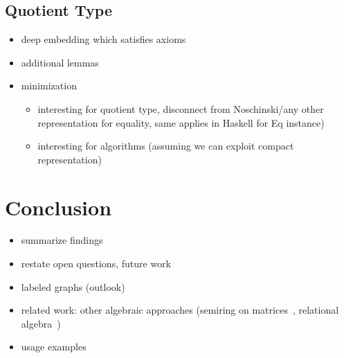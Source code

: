 \documentclass{article}
\begin{document}
\subsection{Quotient Type}\label{sec:quotient}
\begin{itemize}
\item deep embedding which satisfies axioms
\item additional lemmas
\item minimization~\cite{mcconnell2005linear}
  \begin{itemize}
  \item interesting for quotient type, disconnect from Noschinski/any other
    representation for equality, same applies in Haskell for Eq instance)
    \item interesting for algorithms (assuming we can exploit compact
      representation)
    \end{itemize}
\end{itemize}

\section{Conclusion}\label{sec:conclusion}
\begin{itemize}
\item summarize findings
\item restate open questions, future work
\item labeled graphs (outlook)
\item related work: other algebraic approaches (semiring on
  matrices~\cite{dolan2013fun}, relational
  algebra~\cite{berghammer2020relational})
\item usage examples~\cite{mokhov2019language,beaumont2017high}
\end{itemize}
\printbibliography
\end{document}
